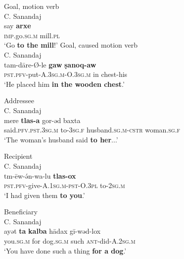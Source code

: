 \documentclass[output=paper,colorlinks,citecolor=brown,draftmode]{langscibook}
\begin{document}
\ea\label{NAINEI:ex:15}
\ea\label{NAINEI:ex:15a}
Goal, motion verb\\
C. Sanandaj \citep[1:\S 4]{Panoussi1990Senaya} \\
\gll say \textbf{arxe} \\
     \textsc{imp.}go\textsc{.sg.m} mill\textsc{.pl} \\
\glt `Go \textbf{to the mill}!'
\ex\label{NAINEI:ex:15b}
Goal, caused motion verb\\
C. Sanandaj \citep[2:\S 14]{Panoussi1990Senaya} \\
\gll tam-dāre-Ø-le \textbf{gaw} \textbf{ṣanoq-aw} \\
     \textsc{pst.pfv-}put\textsc{-A.3sg.m-O.3sg.m} in chest-his \\
\glt `He placed him \textbf{in the wooden chest}.'
\z
\z

\ea\label{NAINEI:ex:16}
Addressee\\
C. Sanandaj \citep[4:\S 13]{Panoussi1990Senaya} \\
\gll mere \textbf{tlas-a} gor-əd baxta \\
     said\textsc{.pfv.pst.3sg.m} to\textsc{-3sg.f} husband\textsc{.sg.m-cstr} woman\textsc{.sg.f} \\
\glt `The woman's husband said \textbf{to her}...'
\z

\ea\label{NAINEI:ex:17}
Recipient\\
C. Sanandaj \citep[3:\S 16]{Panoussi1990Senaya} \\
\gll tm-ēw-ə́n-wa-lu \textbf{tlas-ox}  \\
     \textsc{pst.pfv-}give\textsc{-A.1sg.m-pst-O.3pl} to\textsc{-2sg.m} \\
\glt `I had given them \textbf{to you}.'
\z

\ea\label{NAINEI:ex:18}
Beneficiary\\
C. Sanandaj \citep[2:\S 2]{Panoussi1990Senaya} \\
\gll ayət \textbf{ta} \textbf{kalba} hādax gī-wəd-lox \\
     you\textsc{.sg.m} for dog\textsc{.sg.m} such \textsc{ant-}did\textsc{-A.2sg.m}  \\
\glt `You have done such a thing \textbf{for a dog}.'
\z
\end{document}
